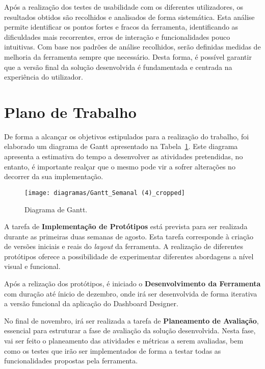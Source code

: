 Após a realização dos testes de usabilidade com os diferentes utilizadores, os resultados obtidos são recolhidos e analisados de forma sistemática. Esta análise permite identificar os pontos fortes e fracos da ferramenta, identificando as dificuldades mais recorrentes, erros de interação e funcionalidades pouco intuitivas. Com base nos padrões de análise recolhidos, serão definidas medidas de melhoria da ferramenta sempre que necessário. Desta forma, é possível garantir que a versão final da solução desenvolvida é fundamentada e centrada na experiência do utilizador.

\section{Plano de Trabalho} %
\label{sec:plano_trabalho}

De forma a alcançar os objetivos estipulados para a realização do trabalho, foi elaborado um diagrama de Gantt apresentado na Tabela~\ref{tab:ganttchart}. Este diagrama apresenta a estimativa do tempo a desenvolver as atividades pretendidas, no entanto, é importante realçar que o mesmo pode vir a sofrer alterações no decorrer da sua implementação.

\begin{figure}[htbp]
  \texttt{[image: diagramas/Gantt\_Semanal (4)\_cropped]}
  \centering
  \caption{Diagrama de Gantt.}
  \label{tab:ganttchart}
\end{figure}

A tarefa de \textbf{Implementação de Protótipos} está prevista para ser realizada durante as primeiras duas semanas de agosto. Esta tarefa corresponde à criação de versões iniciais e reais do \textit{layout} da ferramenta. A realização de diferentes protótipos oferece a possibilidade de experimentar diferentes abordagens a nível visual e funcional.

Após a relização dos protótipos, é iniciado o \textbf{Desenvolvimento da Ferramenta} com duração até ínicio de dezembro, onde irá ser desenvolvida de forma iterativa a versão funcional da aplicação do Dashboard Designer. 

No final de novembro, irá ser realizada a tarefa de \textbf{Planeamento de Avaliação}, essencial para estruturar a fase de avaliação da solução desenvolvida. Nesta fase, vai ser feito o planeamento das atividades e métricas a serem avaliadas, bem como os testes que irão ser implementados de forma a testar todas as funcionalidades propostas pela ferramenta.


